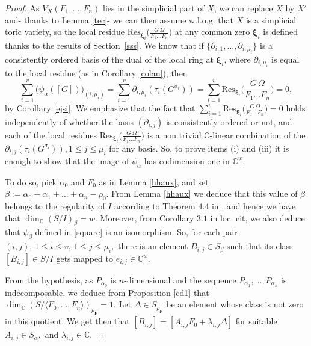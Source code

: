 \documentclass[a4paper,11pt]{amsart}
\newcommand{\C}{\mathbb{C}}
\newcommand{\bfF}{{\boldsymbol{F}}}
\newcommand{\bfxi}{{\boldsymbol{\xi}}}
\numberwithin{thm}{section}
\numberwithin{equation}{section}
\theoremstyle{definition}
\theoremstyle{plain}
\begin{document}
\begin{proof}
As $V_X(F_1, \dots, F_n)$ lies in the simplicial part of $X$, we can replace $X$ by $X'$ and- thanks to Lemma \ref{tec}- we can then assume w.l.o.g. that $X$ is a simplicial toric variety,  so the local residue
$\mbox{Res}_{\bfxi_i}\Big(\frac{G\,\Omega}{F_1\ldots F_n}\Big)$ at any common zero $\bfxi_i$  is defined thanks to the results of Section~\ref{sss}.
We know that if $\{\partial_{i,1},\ldots, \partial_{i,\mu_i}\}$ is 
 a consistently ordered basis of the dual of the local ring at $\bfxi_i$, where $\partial_{i,\mu_i}$ is equal to the local residue (as in Corollary \ref{colau}), then
$$\sum_{i=1}^v \big(\psi_{\alpha}([G])\big)_{(i,\mu_i)}=\sum_{i=1}^v\partial_{i,\mu_i}(\tau_i(G^{\sigma_ i}))=
\sum_{i=1}^v\mbox{Res}_{\bfxi_i}\Big(\frac{G\,\Omega}{F_1\ldots F_n}\Big)=0,$$
by Corollary \ref{ejsi}.  
We emphasize that the  fact that $\sum_{i=1}^v\mbox{Res}_{\bfxi_i}\Big(\frac{G\,\Omega}{F_1\ldots F_n}\Big)=0$ 
holds independently of whether the basis $(\partial_{i,j})$ is consistently ordered or not, and each of the local residues 
$\mbox{Res}_{\bfxi_i}\Big(\frac{G\,\Omega}{F_1\ldots F_n}\Big)$ is  a non trivial $\C$-linear combination of 
the $\partial_{i,j}(\tau_i(G^{\sigma_ i})), 1\leq j\leq \mu_i$ for any basis.  So, to prove items (i) and (iii) it is enough to show that the image of $\psi_\alpha$ has codimension one in $\C^w.$ 


To do so, pick $\alpha_0$ and $F_0$ as in Lemma \ref{hhaux}, and set  $\beta:=\alpha_0+\alpha_1+\ldots+\alpha_n-\rho_0$.  
From Lemma \ref{hhaux} we deduce that this value of $\beta$ belongs to the regularity of $I$ according to Theorem $4.4$ in \cite{BT22},  
and hence we have that $\dim_\C(S/I)_{\beta}=w.$ Moreover, from Corollary $3.1$ in loc. cit, we also deduce that $\psi_\beta$ defined in \eqref{square} is an isomorphism. 
So, for each pair $(i,j),\, 1\leq i\leq v,\, 1\leq j\leq \mu_i,$ there is an element $B_{i,j}\in S_\beta$ such that its class $[B_{i,j}]\in S/I$ gets mapped to $e_{i,j}\in\C^w.$ 


From the hypothesis, as $P_{\alpha_0}$ is $n$-dimensional and the sequence $P_{\alpha_1},\ldots, P_{\alpha_n}$ is indecomposable, 
we deduce from Proposition \ref{cd1} that $\dim_\C\left(S/\langle F_0,\ldots, F_n\rangle\right)_{\rho_\bfF}=1.$ Let $\Delta\in S_{\rho_\bfF}$ 
be an element whose class is not zero in this quotient. We get then that
$[B_{i,j}]=[A_{i,j}F_0+\lambda_{i,j}\Delta]$ for suitable $A_{i,j}\in S_\alpha,$ and $\lambda_{i,j}\in\C.$ 


\end{proof}
\end{document}
